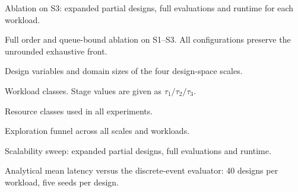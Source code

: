 \documentclass[pdflatex,sn-nature]{sn-jnl}
\theoremstyle{thmstyleone}
\theoremstyle{thmstyletwo}
\theoremstyle{thmstylethree}
\begin{document}
\begin{table}[!htbp]\centering
\caption{Ablation on S3: expanded partial designs, full evaluations and runtime for each
workload.}\label{tabS6}
{\let\scriptsize\tiny\setlength{\tabcolsep}{2pt}}
\end{table}

\begin{table}[!htbp]\centering
\caption{Full order and queue-bound ablation on S1--S3. All configurations preserve the
unrounded exhaustive front.}\label{tabS7}
{\let\scriptsize\tiny\setlength{\tabcolsep}{2pt}}
\end{table}

\begin{table}[!htbp]\centering
\caption{Design variables and domain sizes of the four design-space
scales.}\label{tabS8}
{\let\scriptsize\tiny\setlength{\tabcolsep}{2pt}}
\end{table}

\begin{table}[!htbp]\centering
\caption{Workload classes. Stage values are given as
$\tau_1/\tau_2/\tau_3$.}\label{tabS9}
{\let\scriptsize\tiny\setlength{\tabcolsep}{2pt}}
\end{table}

\begin{table}[!htbp]\centering
\caption{Resource classes used in all experiments.}\label{tabS10}
{\let\scriptsize\tiny\setlength{\tabcolsep}{2pt}}
\end{table}

\begin{table}[!htbp]\centering
\caption{Exploration funnel across all scales and workloads.}\label{tabS11}
{\let\scriptsize\tiny\setlength{\tabcolsep}{2pt}}
\end{table}

\begin{table}[!htbp]\centering
\caption{Scalability sweep: expanded partial designs, full evaluations and
runtime.}\label{tabS12}
{\let\scriptsize\tiny\setlength{\tabcolsep}{2pt}}
\end{table}

\begin{table}[!htbp]\centering
\caption{Analytical mean latency versus the discrete-event evaluator: 40 designs per
workload, five seeds per design.}\label{tabS13}
{\let\scriptsize\tiny\setlength{\tabcolsep}{2pt}}
\end{table}
\end{document}
